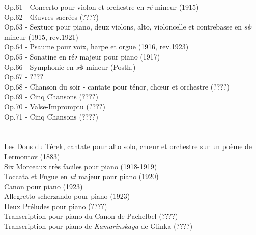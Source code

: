 Op.61 - Concerto pour violon et orchestre en \emph{ré} mineur (1915)\\
Op.62 - Œuvres sacrées ($????$)\\
Op.63 - Sextuor pour piano, deux violons, alto, violoncelle et contrebasse en \emph{si}$\flat$ mineur (1915, rev.1921)\\
Op.64 - Psaume pour voix, harpe et orgue (1916, rev.1923)\\
Op.65 - Sonatine en ré$\flat$ majeur pour piano (1917)\\
Op.66 - Symphonie  en \emph{si}$\flat$ mineur (Posth.)\\
Op.67 - $????$\\
Op.68 - Chanson du soir - cantate pour ténor, chœur et orchestre ($????$)\\
Op.69 - Cinq Chansons ($????$)\\
Op.70 - Valse-Impromptu  ($????$)\\
Op.71 - Cinq Chansons ($????$)\\

\\
\\
Les Dons du Térek, cantate pour alto solo, chœur et orchestre sur un poème de Lermontov (1883)\\
Six Morceaux très faciles pour piano (1918-1919)\\
Toccata et Fugue en \emph{ut} majeur pour piano (1920)\\
Canon pour piano (1923)\\
Allegretto scherzando pour piano (1923)\\
Deux Préludes pour piano ($????$)\\
Transcription pour piano du Canon de Pachelbel ($????$)\\
Transcription pour piano de \emph{Kamarinskaya} de Glinka ($????$)\\


